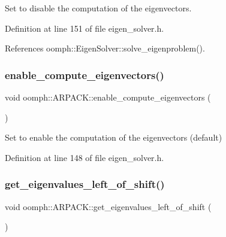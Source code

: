 Set to disable the computation of the eigenvectors. 



Definition at line 151 of file eigen\+\_\+solver.\+h.



References oomph\+::\+Eigen\+Solver\+::solve\+\_\+eigenproblem().

\mbox{\label{classoomph_1_1ARPACK_a9945e2656f93850112f8836a585b32b0}} 
\subsubsection{\texorpdfstring{enable\+\_\+compute\+\_\+eigenvectors()}{enable\_compute\_eigenvectors()}}
{\footnotesize\ttfamily void oomph\+::\+A\+R\+P\+A\+C\+K\+::enable\+\_\+compute\+\_\+eigenvectors (\begin{DoxyParamCaption}{ }\end{DoxyParamCaption})\hspace{0.3cm}{\ttfamily [inline]}}



Set to enable the computation of the eigenvectors (default) 



Definition at line 148 of file eigen\+\_\+solver.\+h.

\mbox{\label{classoomph_1_1ARPACK_a513c4cadda58eb9a0f1319f8b3159852}} 
\subsubsection{\texorpdfstring{get\+\_\+eigenvalues\+\_\+left\+\_\+of\+\_\+shift()}{get\_eigenvalues\_left\_of\_shift()}}
{\footnotesize\ttfamily void oomph\+::\+A\+R\+P\+A\+C\+K\+::get\+\_\+eigenvalues\+\_\+left\+\_\+of\+\_\+shift (\begin{DoxyParamCaption}{ }\end{DoxyParamCaption})\hspace{0.3cm}{\ttfamily [inline]}}



